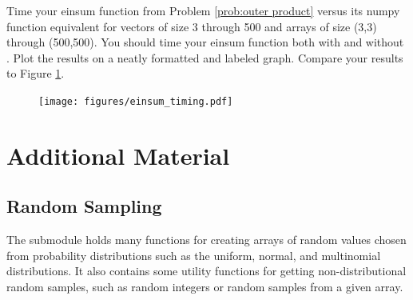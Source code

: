 \begin{problem}
Time your einsum function from Problem \ref{prob:outer product} versus its numpy function equivalent for vectors of size 3 through 500 and arrays of size (3,3) through (500,500). 
You should time your einsum function both with and without . 
Plot the results on a neatly formatted and labeled graph. 
Compare your results to Figure \ref{fig:einsum}.
\begin{figure}[H]
    \texttt{[image: figures/einsum\_timing.pdf]}
    \caption{}
    \label{fig:einsum}
\end{figure}
\end{problem}

\newpage

\section*{Additional Material} %

\subsection*{Random Sampling} %

The submodule  holds many functions for creating arrays of random values chosen from probability distributions such as the uniform, normal, and multinomial distributions.
It also contains some utility functions for getting non-distributional random samples, such as random integers or random samples from a given array.

